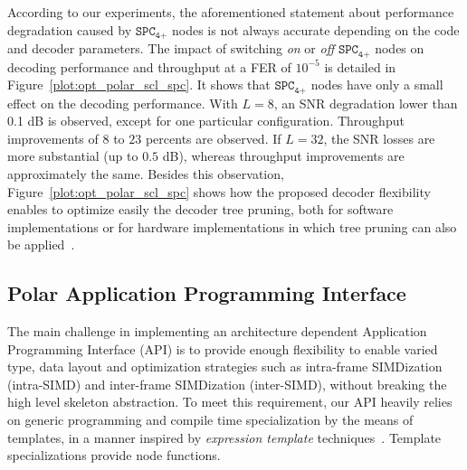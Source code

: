 According to our experiments, the aforementioned statement about performance
degradation caused by $\texttt{SPC}_\texttt{4+}$ nodes is not always accurate
depending on the code and decoder parameters. The impact of switching
\textit{on} or \textit{off} $\texttt{SPC}_\texttt{4+}$ nodes on decoding
performance and throughput at a FER of $10^{-5}$ is detailed in
Figure~\ref{plot:opt_polar_scl_spc}. It shows that $\texttt{SPC}_\texttt{4+}$
nodes have only a small effect on the decoding performance. With $L=8$, an SNR
degradation lower than 0.1 dB is observed, except for one particular
configuration. Throughput improvements of $8$ to $23$ percents are observed. If
$L=32$, the SNR losses are more substantial (up to $0.5$ dB), whereas throughput
improvements are approximately the same. Besides this observation,
Figure~\ref{plot:opt_polar_scl_spc} shows how the proposed decoder flexibility
enables to optimize easily the decoder tree pruning, both for software
implementations or for hardware implementations in which tree pruning can also
be applied~\cite{Lin2014}.

\subsection{Polar Application Programming Interface}
\label{sec:opt_polar_api}


The main challenge in implementing an architecture dependent Application
Programming Interface (API) is to provide enough flexibility to enable varied
type, data layout and optimization strategies such as intra-frame SIMDization
(intra-SIMD) and inter-frame SIMDization (inter-SIMD), without breaking the high
level skeleton abstraction. To meet this requirement, our API heavily relies on
generic programming and compile time specialization by the means of \Cxx
templates, in a manner inspired by \emph{expression template}
techniques~\cite{Stroustrup2013}. Template specializations provide node
functions.

